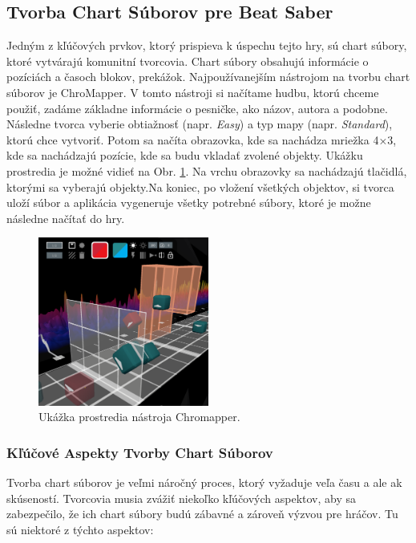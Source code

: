 \subsection{Tvorba Chart Súborov pre Beat Saber}

Jedným z kľúčových prvkov, ktorý prispieva k úspechu tejto hry, sú chart súbory, ktoré vytvárajú komunitní tvorcovia. Chart súbory obsahujú informácie o pozíciách a časoch blokov, prekážok. Najpoužívanejším nástrojom na tvorbu chart súborov je ChroMapper. V tomto nástroji si načítame hudbu, ktorú chceme použiť, zadáme základne informácie o pesničke, ako názov, autora a podobne. Následne tvorca vyberie obtiažnosť (napr. \textit{Easy}) a typ mapy (napr. \textit{Standard}), ktorú chce vytvoriť. Potom sa načíta obrazovka, kde sa nachádza mriežka 4×3, kde sa nachádzajú pozície, kde sa budu vkladať zvolené objekty. Ukážku prostredia je možné vidieť na Obr. \ref{fig:chromapper}. Na vrchu obrazovky sa nachádzajú tlačidlá, ktorými sa vyberajú objekty.Na koniec, po vložení všetkých objektov, si tvorca uloží súbor a aplikácia vygeneruje všetky potrebné súbory, ktoré je možne následne načítať do hry.

\begin{figure}[H]
  \centerline{\includegraphics[width=0.5\textwidth]{images/chromapper.png}}
  \caption{Ukážka prostredia nástroja Chromapper.}
  \label{fig:chromapper}
  \end{figure}

\subsubsection{Kľúčové Aspekty Tvorby Chart Súborov}

Tvorba chart súborov je veľmi náročný proces, ktorý vyžaduje veľa času a ale ak skúseností. Tvorcovia musia zvážiť niekoľko kľúčových aspektov, aby sa zabezpečilo, že ich chart súbory budú zábavné a zároveň výzvou pre hráčov. Tu sú niektoré z týchto aspektov:

